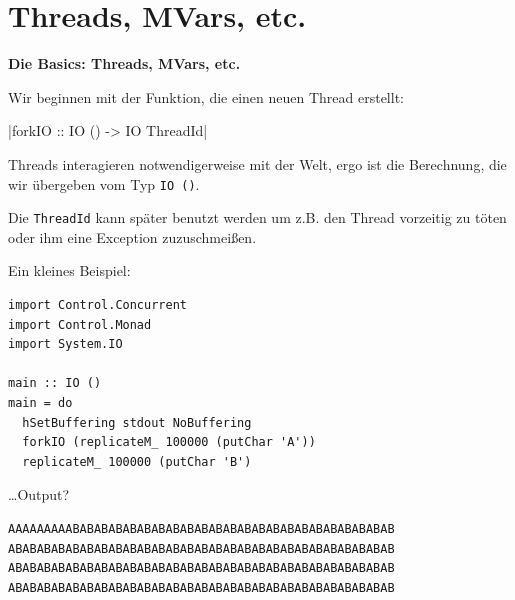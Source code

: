 \documentclass{beamer}
\begin{document}


\section{Threads, MVars, etc.}

\begin{frame}

\begin{center}
\Large
\textbf{Die Basics: Threads, MVars, etc.}
\end{center}

\end{frame}


\begin{frame}[fragile]

Wir beginnen mit der Funktion, die einen neuen Thread erstellt:

|forkIO :: IO () -> IO ThreadId|
\pause

Threads interagieren notwendigerweise mit der Welt, ergo ist die Berechnung, die wir 
übergeben vom Typ \texttt{IO ()}.\smallskip\smallskip
\pause

Die \texttt{ThreadId} kann später benutzt werden um z.B. den Thread vorzeitig zu töten oder ihm
eine Exception zuzuschmeißen.
\end{frame}


\begin{frame}[fragile]

Ein kleines Beispiel:

\begin{verbatim}
import Control.Concurrent
import Control.Monad
import System.IO

main :: IO ()
main = do
  hSetBuffering stdout NoBuffering
  forkIO (replicateM_ 100000 (putChar 'A')) 
  replicateM_ 100000 (putChar 'B')
\end{verbatim}
\pause
\dots Output?
\pause
\begin{verbatim}
AAAAAAAAABABABABABABABABABABABABABABABABABABABABABABAB
ABABABABABABABABABABABABABABABABABABABABABABABABABABAB
ABABABABABABABABABABABABABABABABABABABABABABABABABABAB
ABABABABABABABABABABABABABABABABABABABABABABABABABABAB
\end{verbatim}
\end{frame}
\end{document}
